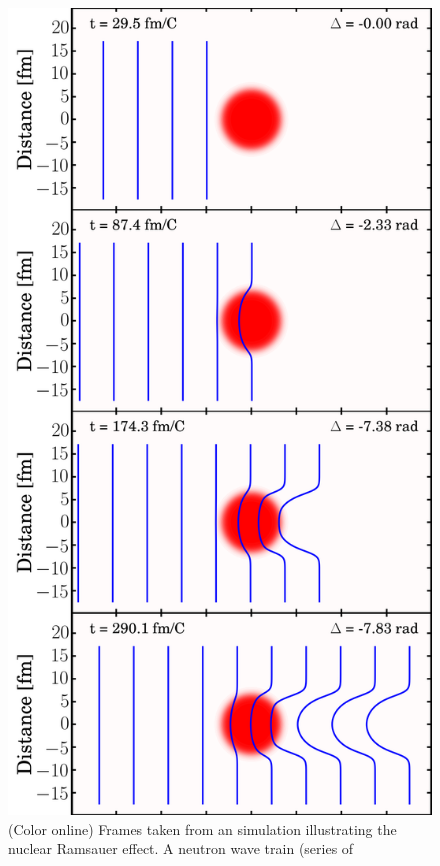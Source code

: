 \documentclass[twocolumn,secnumarabic,amssymb, nobibnotes, aps, prl,
superscriptaddress, nobalancelastpage]{revtex4}
\begin{document}
\begin{figure}
    \hfill\begin{minipage}{0.5\textwidth}\centering
        \includegraphics[scale=0.2]{figures/phaseShiftStillsFigure.png}
        \caption{(Color online) Frames taken from an simulation illustrating the nuclear 
            Ramsauer effect. A neutron wave train (series of
}
\end{minipage}
\end{figure}
\end{document}
